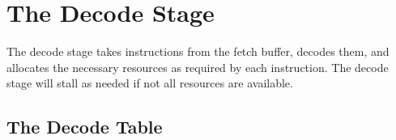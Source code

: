 \chapter{The Decode Stage}

The decode stage takes instructions from the fetch buffer, decodes them, and allocates the necessary resources as required by each instruction.  The decode stage will stall as needed if not all resources are available.

\section{The Decode Table}





